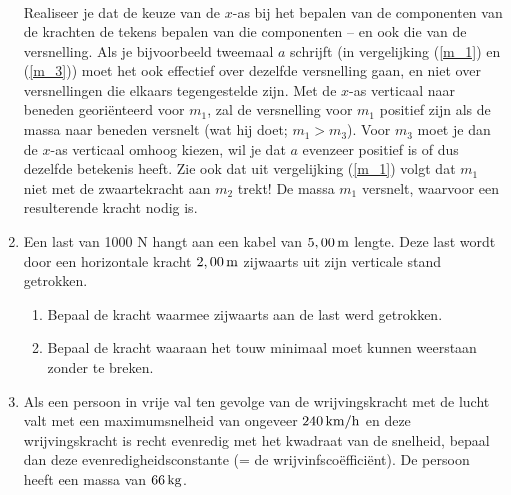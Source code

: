 \begin{enumerate}
\begin{oplossing}
\begin{eqnarray*}
\end{eqnarray*}
\newline
\newline
Realiseer je dat de keuze van de $x$-as bij het bepalen van de componenten van de krachten de tekens bepalen van die componenten -- en ook die van de versnelling. Als je bijvoorbeeld tweemaal $a$ schrijft (in vergelijking (\ref{m_1}) en (\ref{m_3})) moet het ook effectief over dezelfde versnelling gaan, en niet over versnellingen die elkaars tegengestelde zijn. Met de $x$-as verticaal naar beneden geori\"enteerd voor $m_1$, zal de versnelling voor $m_1$ positief zijn als de massa naar beneden versnelt (wat hij doet; $m_1>m_3$). Voor $m_3$ moet je dan de $x$-as verticaal omhoog kiezen, wil je dat $a$ evenzeer positief is of dus dezelfde betekenis heeft.
\newline
\newline
Zie ook dat uit vergelijking (\ref{m_1}) volgt dat $m_1$ niet met de zwaartekracht aan $m_2$ trekt! De massa $m_1$ versnelt, waarvoor een resulterende kracht nodig is. 
\end{oplossing}



\item Een last van 1000 N hangt aan een kabel van $5,00\rm\,m$
lengte. Deze last wordt door een horizontale kracht $2,00\rm\,m$
zijwaarts uit zijn verticale stand getrokken.
\begin{enumerate}
    \item Bepaal de kracht waarmee zijwaarts aan de last werd
    getrokken.
    \item Bepaal de kracht waaraan het touw minimaal moet kunnen
    weerstaan zonder te breken.
\end{enumerate}


\item Als een persoon in vrije val ten gevolge van de
wrijvingskracht met de lucht valt met een maximumsnelheid van
ongeveer $240\rm\,km/h$ en deze wrijvingskracht is recht evenredig
met het kwadraat van de snelheid, bepaal dan deze
evenredigheidsconstante (= de wrijvinfsco\"effici\"ent). De persoon
heeft een massa van $66\rm\,kg$.



\end{enumerate}
